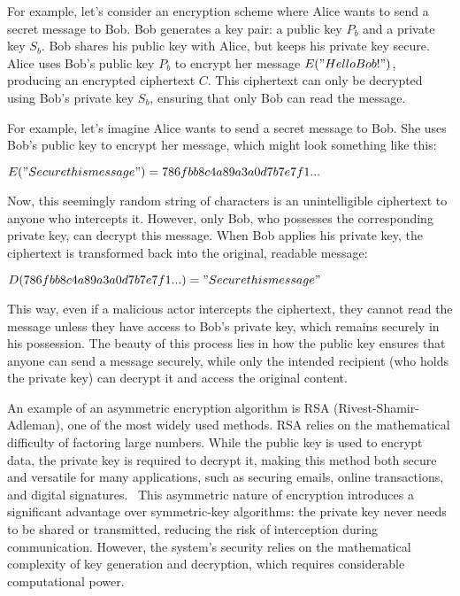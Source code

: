\documentclass[12pt,a4paper]{report}
\begin{document}
For example, let's consider an encryption scheme where Alice wants to send a secret message to Bob. Bob generates a key pair: a public key \( P_b \) and a private key \( S_b \). Bob shares his public key with Alice, but keeps his private key secure. Alice uses Bob's public key \( P_b \) to encrypt her message \( E("Hello Bob!") \), producing an encrypted ciphertext \( C \). This ciphertext can only be decrypted using Bob’s private key \( S_b \), ensuring that only Bob can read the message.

For example, let's imagine Alice wants to send a secret message to Bob. She uses Bob's public key to encrypt her message, which might look something like this:

\newline

\( E("Secure this message") = 786fbb8c4a89a3a0d7b7e7f1... \)
\newline

Now, this seemingly random string of characters is an unintelligible ciphertext to anyone who intercepts it. However, only Bob, who possesses the corresponding private key, can decrypt this message. When Bob applies his private key, the ciphertext is transformed back into the original, readable message:

\newline

\( D(786fbb8c4a89a3a0d7b7e7f1...) = "Secure this message" \)
\newline

This way, even if a malicious actor intercepts the ciphertext, they cannot read the message unless they have access to Bob's private key, which remains securely in his possession. The beauty of this process lies in how the public key ensures that anyone can send a message securely, while only the intended recipient (who holds the private key) can decrypt it and access the original content.


An example of an asymmetric encryption algorithm is RSA (Rivest-Shamir-Adleman), one of the most widely used methods. RSA relies on the mathematical difficulty of factoring large numbers. While the public key is used to encrypt data, the private key is required to decrypt it, making this method both secure and versatile for many applications, such as securing emails, online transactions, and digital signatures.
\
This asymmetric nature of encryption introduces a significant advantage over symmetric-key algorithms: the private key never needs to be shared or transmitted, reducing the risk of interception during communication. However, the system's security relies on the mathematical complexity of key generation and decryption, which requires considerable computational power.
\end{document}

